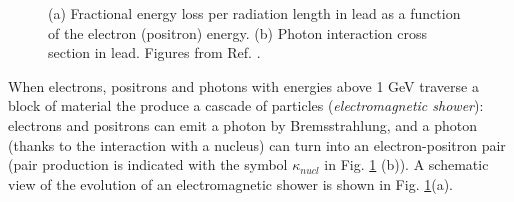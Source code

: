 \begin{figure}[ht]
\centering
{}
\caption{(a) Fractional energy loss per radiation length in lead as a function of the electron (positron) energy. (b) Photon interaction cross section in lead. Figures from Ref. \cite{Patrignani:2016xqp}. }
\label{fig:det:shower_elec}
\end{figure}


When electrons, positrons and photons with energies above 1 GeV traverse a block of material the produce a cascade of particles (\textit{electromagnetic shower}): electrons and positrons can emit a photon by Bremsstrahlung, and a photon (thanks to the interaction with a nucleus) can turn into an electron-positron pair (pair production is indicated with the symbol $\kappa_{nucl}$ in Fig. \ref{fig:det:shower_elec} (b)). A schematic view of the evolution of an electromagnetic shower is shown  in Fig. \ref{fig:det:shower_elec}(a). 

